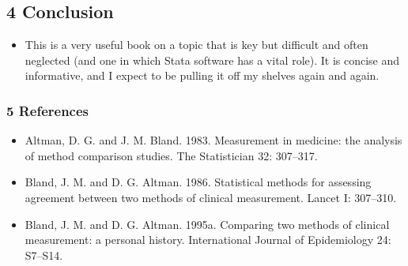 \begin{frame}
\begin{itemize}
\end{itemize}

\end{frame}







\newpage

\subsection{4 Conclusion}
\begin{itemize}

\item 
This is a very useful book on a topic that is key but difficult and often neglected (and
one in which Stata software has a vital role). It is concise and informative, and I expect
to be pulling it off my shelves again and again.

\end{itemize}



\begin{frame}

\frametitle{5 References}

\begin{itemize}

\item Altman, D. G. and J. M. Bland. 1983. Measurement in medicine: the analysis of method
comparison studies. The Statistician 32: 307–317.

\item Bland, J. M. and D. G. Altman. 1986. Statistical methods for assessing agreement
between two methods of clinical measurement. Lancet I: 307–310.

\item Bland, J. M. and D. G. Altman. 1995a. Comparing two methods of clinical measurement: a personal history. International
Journal of Epidemiology 24: S7–S14.

\end{itemize}

\end{frame}









